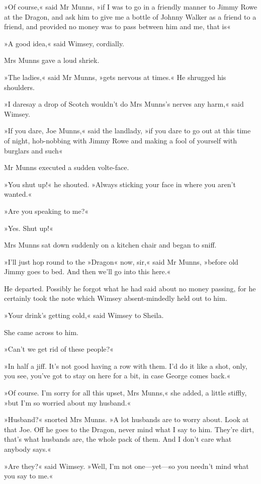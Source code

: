 »Of course,« said Mr Munns, »if I was to go in a friendly manner to Jimmy Rowe at the Dragon, and ask him to give me a bottle of Johnny Walker as a friend to a friend, and provided no money was to pass between him and me, that is\longdash«

»A good idea,« said Wimsey, cordially.

Mrs Munns gave a loud shriek.

»The ladies,« said Mr Munns, »gets nervous at times.« He shrugged his shoulders.

»I daresay a drop of Scotch wouldn't do Mrs Munns's nerves any harm,« said Wimsey.

»If you dare, Joe Munns,« said the landlady, »if you dare to go out at this time of night, hob-nobbing with Jimmy Rowe and making a fool of yourself with burglars and such\longdash«

Mr Munns executed a sudden volte-face.

»You shut up!« he shouted. »Always sticking your face in where you aren't wanted.«

»Are you speaking to me?«

»Yes. Shut up!«

Mrs Munns sat down suddenly on a kitchen chair and began to sniff.

»I'll just hop round to the »Dragon« now, sir,« said Mr Munns, »before old Jimmy goes to bed. And then we'll go into this here.«

He departed. Possibly he forgot what he had said about no money passing, for he certainly took the note which Wimsey absent-mindedly held out to him.

»Your drink's getting cold,« said Wimsey to Sheila.

She came across to him.

»Can't we get rid of these people?«

»In half a jiff. It's not good having a row with them. I'd do it like a shot, only, you see, you've got to stay on here for a bit, in case George comes back.«

»Of course. I'm sorry for all this upset, Mrs Munns,« she added, a little stiffly, »but I'm so worried about my husband.«

»Husband?« snorted Mrs Munns. »A lot husbands are to worry about. Look at that Joe. Off he goes to the Dragon, never mind what I say to him. They're dirt, that's what husbands are, the whole pack of them. And I don't care what anybody says.«

»Are they?« said Wimsey. »Well, I'm not one\allowbreak---\allowbreak yet---so you needn't mind what you say to me.«

